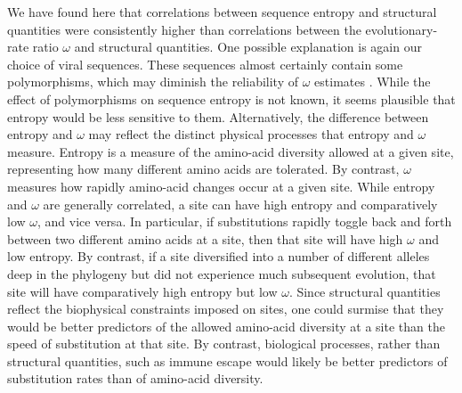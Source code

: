 \documentclass[smallextended]{svjour3}
\begin{document}
We have found here that correlations between sequence entropy and structural quantities were consistently higher than correlations between the evolutionary-rate ratio $\omega$ and structural quantities. One possible explanation is again our choice of viral sequences. These sequences almost certainly contain some polymorphisms, which may diminish the reliability of $\omega$ estimates \citep{KryazhimskiyPlotkin2008}. While the effect of polymorphisms on sequence entropy is not known, it seems plausible that entropy would be less sensitive to them. Alternatively, the difference between entropy and $\omega$ may reflect the distinct physical processes that entropy and $\omega$ measure. Entropy is a measure of the amino-acid diversity allowed at a given site, representing how many different amino acids are tolerated. By contrast, $\omega$ measures how rapidly amino-acid changes occur at a given site. While entropy and $\omega$ are generally correlated, a site can have high entropy and comparatively low $\omega$, and vice versa. In particular, if substitutions rapidly toggle back and forth between two different amino acids at a site, then that site will have high $\omega$ and low entropy. By contrast, if a site diversified into a number of different alleles deep in the phylogeny but did not experience much subsequent evolution, that site will have comparatively high entropy but low $\omega$. Since structural quantities reflect the biophysical constraints imposed on sites, one could surmise that they would be better predictors of the allowed amino-acid diversity at a site than the speed of substitution at that site. By contrast, biological processes, rather than structural quantities, such as immune escape would likely be better predictors of substitution rates than of amino-acid diversity. 
\end{document}
